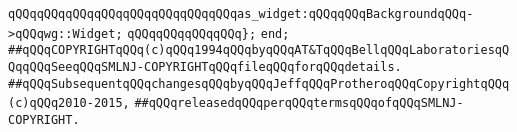 \newline
\verb|qQQqqQQqqQQqqQQqqQQqqQQqqQQqqQQqas_widget:qQQqqQQqBackgroundqQQq->qQQqwg::Widget;|\newline
\verb|qQQqqQQqqQQqqQQq};|\newline
\newline
\verb|end;|\newline
\newline
\newline
\newline
\verb|##qQQqCOPYRIGHTqQQq(c)qQQq1994qQQqbyqQQqAT&TqQQqBellqQQqLaboratoriesqQQqqQQqSeeqQQqSMLNJ-COPYRIGHTqQQqfileqQQqforqQQqdetails.|\newline
\verb|##qQQqSubsequentqQQqchangesqQQqbyqQQqJeffqQQqProtheroqQQqCopyrightqQQq(c)qQQq2010-2015,|\newline
\verb|##qQQqreleasedqQQqperqQQqtermsqQQqofqQQqSMLNJ-COPYRIGHT.|\newline

